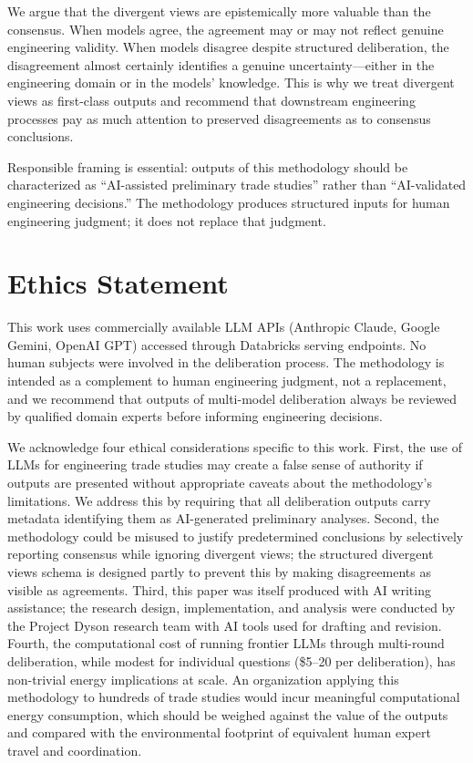 \documentclass[11pt,a4paper]{article}
\begin{document}
We argue that the divergent views are epistemically more valuable than the consensus. When models agree, the agreement may or may not reflect genuine engineering validity. When models disagree despite structured deliberation, the disagreement almost certainly identifies a genuine uncertainty---either in the engineering domain or in the models' knowledge. This is why we treat divergent views as first-class outputs and recommend that downstream engineering processes pay as much attention to preserved disagreements as to consensus conclusions.

Responsible framing is essential: outputs of this methodology should be characterized as ``AI-assisted preliminary trade studies'' rather than ``AI-validated engineering decisions.'' The methodology produces structured inputs for human engineering judgment; it does not replace that judgment.

\section{Ethics Statement}
\label{sec:ethics}

This work uses commercially available LLM APIs (Anthropic Claude, Google Gemini, OpenAI GPT) accessed through Databricks serving endpoints. No human subjects were involved in the deliberation process. The methodology is intended as a complement to human engineering judgment, not a replacement, and we recommend that outputs of multi-model deliberation always be reviewed by qualified domain experts before informing engineering decisions.

We acknowledge four ethical considerations specific to this work. First, the use of LLMs for engineering trade studies may create a false sense of authority if outputs are presented without appropriate caveats about the methodology's limitations. We address this by requiring that all deliberation outputs carry metadata identifying them as AI-generated preliminary analyses. Second, the methodology could be misused to justify predetermined conclusions by selectively reporting consensus while ignoring divergent views; the structured divergent views schema is designed partly to prevent this by making disagreements as visible as agreements. Third, this paper was itself produced with AI writing assistance; the research design, implementation, and analysis were conducted by the Project Dyson research team with AI tools used for drafting and revision. Fourth, the computational cost of running frontier LLMs through multi-round deliberation, while modest for individual questions (\$5--20 per deliberation), has non-trivial energy implications at scale. An organization applying this methodology to hundreds of trade studies would incur meaningful computational energy consumption, which should be weighed against the value of the outputs and compared with the environmental footprint of equivalent human expert travel and coordination.
\end{document}

